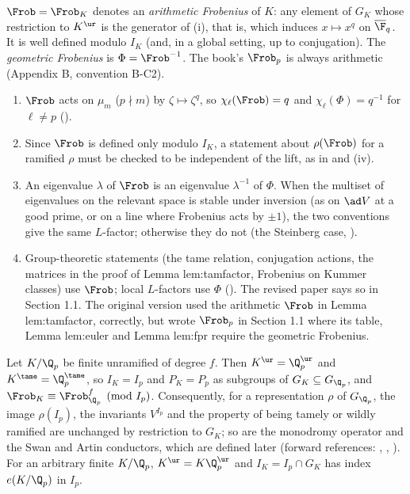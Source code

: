 \begin{convention}[Frobenius]\label{conv:local:frobenius}
$\Frob=\Frob_K$ denotes an \emph{arithmetic Frobenius} of $K$: any element of $G_K$ whose restriction to $K^{\ur}$ is the generator of
(i), that is, which induces $x\mapsto x^q$ on $\overline\F_q$. It is well defined modulo $I_K$ (and, in a global setting, up to
conjugation). The \emph{geometric Frobenius} is $\Phi=\Frob^{-1}$. The book's $\Frob_p$ is always arithmetic (Appendix B, convention B-C2).
\begin{enumerate}[label=(\alph*)]
\item $\Frob$ acts on $\mu_m$ ($p\nmid m$) by $\zeta\mapsto\zeta^q$, so $\chi_\ell(\Frob)=q$ and $\chi_\ell(\Phi)=q^{-1}$ for $\ell\ne p$
().
\item Since $\Frob$ is defined only modulo $I_K$, a statement about $\rho(\Frob)$ for a ramified $\rho$ must be checked to be independent of the
lift, as in  and (iv).
\item An eigenvalue $\lambda$ of $\Frob$ is an eigenvalue $\lambda^{-1}$ of $\Phi$. When the multiset of eigenvalues on the relevant space is stable
under inversion (as on $\ad V$ at a good prime, or on a line where Frobenius acts by $\pm1$), the two conventions give the same $L$-factor;
otherwise they do not (the Steinberg case, ).
\item Group-theoretic statements (the tame relation, conjugation actions, the matrices in the proof of Lemma lem:tamfactor, Frobenius on Kummer
classes) use $\Frob$; local $L$-factors use $\Phi$ (). The revised paper says so in Section 1.1. The original version used
the arithmetic $\Frob$ in Lemma lem:tamfactor, correctly, but wrote $\Frob_p$ in Section 1.1 where its table, Lemma lem:euler and Lemma lem:fpr require
the geometric Frobenius.
\end{enumerate}
\end{convention}

\begin{proposition}\label{prop:local:unram-basechange}
Let $K/\Q_p$ be finite unramified of degree $f$. Then $K^{\ur}=\Q_p^{\ur}$ and $K^{\tame}=\Q_p^{\tame}$, so $I_K=I_p$ and $P_K=P_p$ as subgroups of
$G_K\subseteq G_{\Q_p}$, and $\Frob_K\equiv\Frob_{\Q_p}^f\pmod{I_p}$. Consequently, for a representation $\rho$ of $G_{\Q_p}$, the image $\rho(I_p)$, the
invariants $V^{I_p}$ and the property of being tamely or wildly ramified are unchanged by restriction to $G_K$; so are the monodromy operator and the
Swan and Artin conductors, which are defined later (forward references: , , ).
For an arbitrary finite $K/\Q_p$, $K^{\ur}=K\Q_p^{\ur}$ and $I_K=I_p\cap G_K$ has index $e(K/\Q_p)$ in $I_p$.
\end{proposition}

